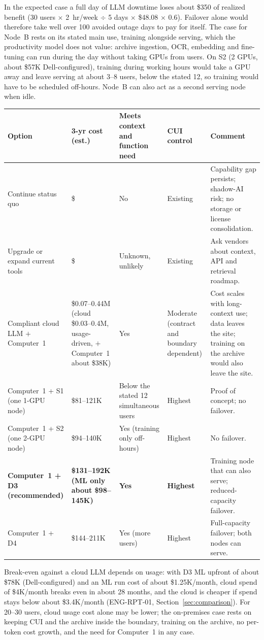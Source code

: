 In the expected case a full day of LLM downtime loses about \$350 of realized benefit
(30 users $\times$ 2~hr/week $\div$ 5 days $\times$ \$48.08 $\times$ 0.6). Failover alone
would therefore take well over 100 avoided outage days to pay for itself. The case for
Node~B rests on its stated main use, training alongside serving, which the productivity
model does not value: archive ingestion, OCR, embedding and fine-tuning can run during
the day without taking GPUs from users. On S2 (2 GPUs, about \$57K Dell-configured),
training during working hours would take a GPU away and leave serving at about 3--8
users, below the stated 12, so training would have to be scheduled off-hours. Node~B can
also act as a second serving node when idle. 


{\footnotesize
\begin{xltabular}{\textwidth}{@{}Y{1.25} Y{0.909} Y{0.795} Y{0.682} Y{1.364}@{}}
  \toprule
  Option & 3-yr cost (est.) & Meets context and function need & CUI control & Comment \\
  \midrule
  \endhead
  Continue status quo & \$ & No & Existing & Capability gap persists; shadow-AI risk; no storage or license consolidation. \\
  Upgrade or expand current tools & \$ & Unknown, unlikely & Existing & Ask vendors about context, API and retrieval roadmap. \\
  Compliant cloud LLM $+$ Computer~1 & \$0.07--0.44M (cloud \$0.03--0.4M, usage-driven, $+$ Computer~1 about \$38K) & Yes & Moderate (contract and boundary dependent) & Cost scales with long-context use; data leaves the site; training on the archive would also leave the site. \\
  Computer~1 + S1 (one 1-GPU node) & \$81--121K & Below the stated 12 simultaneous users & Highest & Proof of concept; no failover. \\
  Computer~1 + S2 (one 2-GPU node) & \$94--140K & Yes (training only off-hours) & Highest & No failover. \\
  \textbf{Computer~1 + D3 (recommended)} & \textbf{\$131--192K (ML only about \$98--145K)} & \textbf{Yes} & \textbf{Highest} & Training node that can also serve; reduced-capacity failover. \\
  Computer~1 + D4 & \$144--211K & Yes (more users) & Highest & Full-capacity failover; both nodes can serve. \\
  \bottomrule
\end{xltabular}}
Break-even against a cloud LLM depends on usage: with D3 ML upfront of about \$78K (Dell-configured) and an ML run cost of about \$1.25K/month, cloud spend of \$4K/month breaks even in about
28 months, and the cloud is cheaper if spend stays below about \$3.4K/month (ENG-RPT-01,
Section~\ref{sec:comparison}). For 20--30 users, cloud usage cost alone may be lower; the
on-premises case rests on keeping CUI and the archive inside the boundary, training on
the archive, no per-token cost growth, and the need for Computer~1 in any case.
